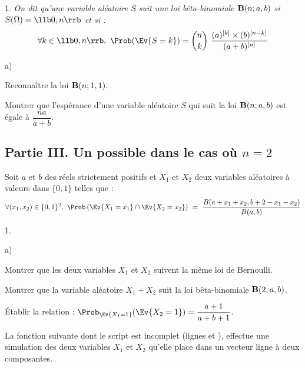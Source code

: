 \documentclass[11pt]{article}%
\begin{document}
\begin{noliste}{1.}
  \noindent
  {\itshape On dit qu'une variable aléatoire $S$ suit une loi
    bêta-binomiale ${\bf B}(n;a,b)$ si $S(\Omega)=\llb 0,n\rrb$ et si
    :
    \[
    \forall k \in \llb 0,n \rrb, \ \Prob(\Ev{S=k}) = \dbinom{n}{k} \
    \dfrac{(a)^{[k]} \times (b)^{[n-k]}}{(a+b)^{[n]}}
    \]
  }




  \begin{noliste}{a)}
    \setlength{\itemsep}{2mm}
    \setcounter{enumii}{1}
    \item Reconnaître la loi ${\bf B}(n;1,1)$. 

      

    \item Montrer que l'espérance d'une variable aléatoire $S$ qui
      suit la loi ${\bf B}(n;a,b)$ est égale à $\dfrac{na}{a+b}$.

      
  \end{noliste}
\end{noliste}




\subsection*{Partie III. Un possible dans le cas où $n=2$}

\noindent
Soit $a$ et $b$ des réels strictement positifs et $X_1$ et $X_2$ deux 
variables aléatoires à valeurs dans $\{0,1\}$ telles que :
\[
\forall (x_1,x_2) \in \{0,1\}^2, \ \Prob\left(\Ev{X_1=x_1}\cap
  \Ev{X_2=x_2}\right) \ = \ \dfrac{B(a+x_1+x_2,b+2-x_1-x_2)}{B(a,b)}
\]

\begin{noliste}{1.}
  \setlength{\itemsep}{4mm} %
  \setcounter{enumi}{7}
\item
  \begin{noliste}{a)}
    \setlength{\itemsep}{2mm}
  \item Montrer que les deux variables $X_1$ et $X_2$ suivent la même
    loi de Bernoulli.

    




  \item Montrer que la variable aléatoire $X_1 + X_2$ suit la loi
    bêta-binomiale ${\bf B}(2;a,b)$.

    


    

  \item Établir la relation : $\Prob_{\Ev{X_1=1}}(\Ev{X_2=1}) =
    \dfrac{a+1}{a+b+1}$.

    
  \end{noliste}
  
\item La fonction \Scilab{} suivante dont le script est incomplet
  (lignes \ligne{7} et \ligne{11}), effectue une simulation des deux
  variables $X_1$ et $X_2$ qu'elle place dans un vecteur ligne à deux
  composantes.
\end{noliste}
\end{document}

